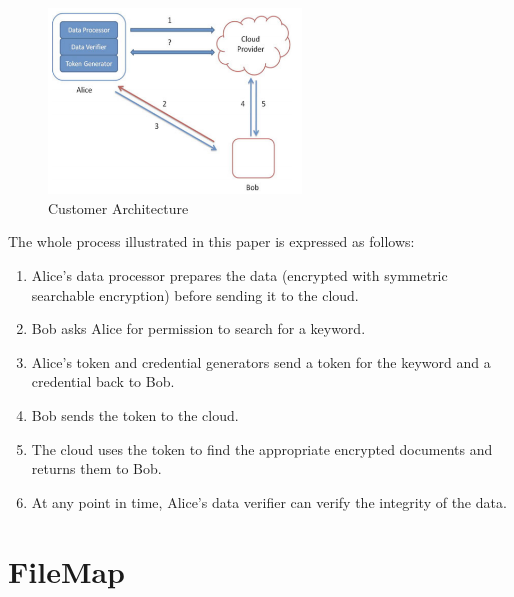\begin{figure}[h]
        \centering
        \includegraphics[width=0.6\textwidth]{figures/Customer_Architecture.png}
        \caption[Customer Architecture] {Customer Architecture\cite{Kamara2010}}
\end{figure}

The whole process illustrated in this paper is expressed as follows:
\begin{enumerate}
  \item 
  Alice’s data processor prepares the data (encrypted with symmetric searchable encryption) before sending it to the cloud.
  \item 
  Bob asks Alice for permission to search for a keyword.
  \item 
  Alice’s token and credential generators send a token for the keyword and a credential back to Bob.
  \item 
  Bob sends the token to the cloud.
  \item 
  The cloud uses the token to find the appropriate encrypted documents and returns them to Bob.
  \item 
  At any point in time, Alice’s data verifier can verify the integrity of the data.
\end{enumerate}

\section{FileMap}

